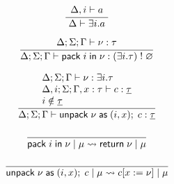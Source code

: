 \[\frac{
	\begin{array}{l}
	\Delta , i \vdash a  \\
	\end{array}
}{
	\Delta \vdash \exists i . a
}\]

\[\frac{
	\begin{array}{l}
	\Delta;\Sigma;\Gamma \vdash \nu : \tau \\
	\end{array}
}{
	\Delta;\Sigma;\Gamma \vdash \mathsf{pack} \; i \; \mathsf{in} \; \nu : (\exists i . \tau) \; ! \; \varnothing
}\]

\[\frac{
	\begin{array}{l}
	\Delta;\Sigma;\Gamma \vdash \nu : \exists i . \tau \\
	\Delta,i;\Sigma;\Gamma,x:\tau \vdash c : \underline{\tau} \\
	i \notin \underline{\tau} \\
	\end{array}
}{
	\Delta;\Sigma;\Gamma \vdash \mathsf{unpack} \; \nu \; \mathsf{as} \; ( i, x ) ;\; c : \underline{\tau}
}\]

\[\frac{
	\begin{array}{l}
	\end{array}
}{
	\mathsf{pack} \; i \; \mathsf{in} \; \nu \; | \; \mu \rightsquigarrow \mathsf{return} \; \nu \; | \; \mu
}\]

\[\frac{
	\begin{array}{l}
	\end{array}
}{
	\mathsf{unpack} \; \nu \; \mathsf{as} \; ( i, x ) ;\; c \; | \; \mu \rightsquigarrow c[x := \nu] \; | \; \mu
}\]

